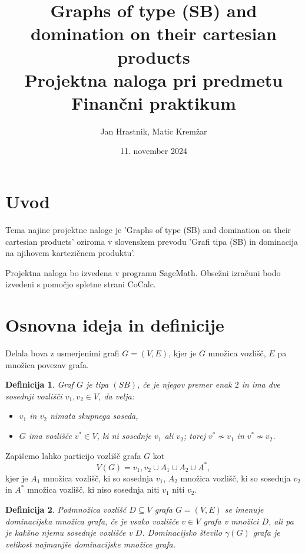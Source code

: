 \documentclass{article}
\begin{document}
\newtheorem{definition}{Definicija}


\title{Graphs of type (SB) and domination on their cartesian products\\ 
\large Projektna naloga pri predmetu Finančni praktikum }
\author{Jan Hrastnik, Matic Kremžar}
\date{11. november 2024}
\maketitle

\section{Uvod}
Tema najine projektne naloge je 'Graphs of type (SB) and domination on their cartesian products' oziroma v slovenskem prevodu
'Grafi tipa (SB) in dominacija na njihovem kartezičnem produktu'.

Projektna naloga bo izvedena v programu SageMath. Obsežni izračuni bodo izvedeni s pomočjo spletne strani CoCalc.

\section{Osnovna ideja in definicije}
Delala bova z usmerjenimi grafi $G = (V,E)$, kjer je $G$ množica vozlišč, $E$ 
pa množica povezav grafa.

\begin{definition}
    Graf $G$ je tipa $(SB)$, če je njegov premer enak $2$ in ima dve sosednji vozlišči $v_1, v_2\in V$, da velja:
    \begin{itemize}
        \item $v_1$ in $v_2$ nimata skupnega soseda,
        \item $G$ ima vozlišče $v^*\in V$, ki ni sosednje $v_1$ ali $v_2$; torej $v^*\not\sim v_1$ in $v^*\not\sim v_2$. \newline
    \end{itemize}
\end{definition} 

Zapišemo lahko particijo vozlišč grafa $G$ kot $$V(G) = {v_1, v_2} \cup A_1 \cup A_2 \cup A^*,$$
kjer je $A_1$ množica vozlišč, ki so sosednja $v_1$, $A_2$ množica vozlišč, ki so sosednja $v_2$ in 
$A^*$ množica vozlišč, ki niso sosednja niti $v_1$ niti $v_2$.

\begin{definition}
   Podmnožica vozlišč $D\subseteq V$ grafa $G=(V,E)$ se imenuje \emph{dominacijska množica} grafa,
   če je vsako vozlišče $v\in V$ grafa v množici $D$, ali pa je kakšno njemu sosednje vozlišče
   v $D$. \emph{Dominacijsko število $\gamma(G)$} grafa je velikost najmanjše dominacijske
   množice grafa.
\end{definition}
\end{document}
